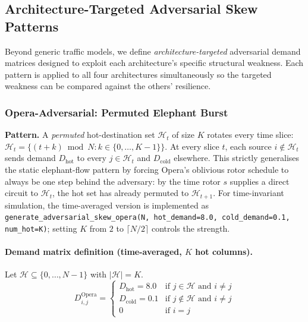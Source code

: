 \documentclass{article}
\begin{document}
    \subsection{Architecture-Targeted Adversarial Skew Patterns}
    \label{sec:adversarial_skew}

    Beyond generic traffic models, we define \emph{architecture-targeted} adversarial demand matrices designed to exploit each architecture's specific structural weakness.  Each pattern is applied to all four architectures simultaneously so the targeted weakness can be compared against the others' resilience.

    \subsubsection{Opera-Adversarial: Permuted Elephant Burst}
    \label{sec:adv_opera}
    \textbf{Pattern.}  A \emph{permuted} hot-destination set $\mathcal{H}_t$ of size $K$ rotates every time slice: $\mathcal{H}_t = \{(t+k) \bmod N : k \in \{0,\ldots,K{-}1\}\}$.  At every slice $t$, each source $i \notin \mathcal{H}_t$ sends demand $D_{\text{hot}}$ to every $j \in \mathcal{H}_t$ and $D_{\text{cold}}$ elsewhere.  This strictly generalises the static elephant-flow pattern by forcing Opera's oblivious rotor schedule to always be one step behind the adversary: by the time rotor $s$ supplies a direct circuit to $\mathcal{H}_t$, the hot set has already permuted to $\mathcal{H}_{t+1}$.  For time-invariant simulation, the time-averaged version is implemented as \texttt{generate\_adversarial\_skew\_opera(N, hot\_demand=8.0, cold\_demand=0.1, num\_hot=K)}; setting $K$ from $2$ to $\lceil N/2 \rceil$ controls the strength.

    \paragraph{Demand matrix definition (time-averaged, $K$ hot columns).}  Let $\mathcal{H} \subseteq \{0,\ldots,N{-}1\}$ with $|\mathcal{H}| = K$.
    \begin{equation}
        D^{\text{Opera}}_{i,j} =
        \begin{cases}
            D_{\text{hot}}  = 8.0 & \text{if } j \in \mathcal{H} \text{ and } i \neq j \\
            D_{\text{cold}} = 0.1 & \text{if } j \notin \mathcal{H} \text{ and } i \neq j \\
            0                     & \text{if } i = j
        \end{cases}
        \label{eq:matrix_opera}
    \end{equation}
\end{document}

